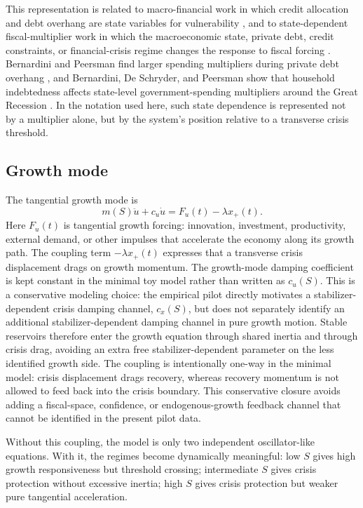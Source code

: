 \documentclass[11pt]{article}
\begin{document}
This representation is related to macro-financial work in which credit allocation and debt overhang are state variables for vulnerability \cite{MullerVerner2024,Ivashina2024}, and to state-dependent fiscal-multiplier work in which the macroeconomic state, private debt, credit constraints, or financial-crisis regime changes the response to fiscal forcing \cite{Baum2012,BernardiniPeersman2018,BernardiniDeSchryderPeersman2020,McManus2020,FariaCastro2024}. Bernardini and Peersman find larger spending multipliers during private debt overhang \cite{BernardiniPeersman2018}, and Bernardini, De Schryder, and Peersman show that household indebtedness affects state-level government-spending multipliers around the Great Recession \cite{BernardiniDeSchryderPeersman2020}. In the notation used here, such state dependence is represented not by a multiplier alone, but by the system's position relative to a transverse crisis threshold.

\subsection{Growth mode}
The tangential growth mode is
\begin{equation}
m(S)\ddot{u}+c_u\dot{u}=F_u(t)-\lambda x_+(t).
\label{eq:growth}
\end{equation}
Here $F_u(t)$ is tangential growth forcing: innovation, investment, productivity, external demand, or other impulses that accelerate the economy along its growth path. The coupling term $-\lambda x_+(t)$ expresses that a transverse crisis displacement drags on growth momentum. The growth-mode damping coefficient is kept constant in the minimal toy model rather than written as $c_u(S)$. This is a conservative modeling choice: the empirical pilot directly motivates a stabilizer-dependent crisis damping channel, $c_x(S)$, but does not separately identify an additional stabilizer-dependent damping channel in pure growth motion. Stable reservoirs therefore enter the growth equation through shared inertia and through crisis drag, avoiding an extra free stabilizer-dependent parameter on the less identified growth side. The coupling is intentionally one-way in the minimal model: crisis displacement drags recovery, whereas recovery momentum is not allowed to feed back into the crisis boundary. This conservative closure avoids adding a fiscal-space, confidence, or endogenous-growth feedback channel that cannot be identified in the present pilot data.

Without this coupling, the model is only two independent oscillator-like equations. With it, the regimes become dynamically meaningful: low $S$ gives high growth responsiveness but threshold crossing; intermediate $S$ gives crisis protection without excessive inertia; high $S$ gives crisis protection but weaker pure tangential acceleration.
\end{document}

